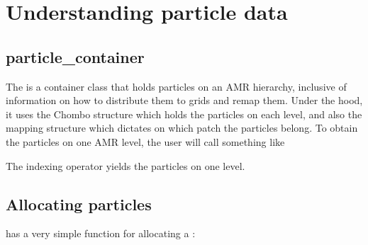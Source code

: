 \documentclass[letterpaper,10pt,english]{sphinxmanual}
\begin{document}
\section{Understanding particle data}
\label{\detokenize{ParticleData:understanding-particle-data}}\label{\detokenize{ParticleData:chap-particledata}}\label{\detokenize{ParticleData::doc}}

\subsection{particle\_container}
\label{\detokenize{ParticleData:particle-container}}
The  is a container class that holds particles on an AMR hierarchy, inclusive of information on how to distribute them to grids and remap them.
Under the hood, it uses the Chombo structure  which holds the particles on each level, and also the mapping structure  which dictates on which patch the particles belong.
To obtain the particles on one AMR level, the user will call something like

\begin{sphinxVerbatim}[commandchars=\\\{\},formatcom=\scriptsize]
 

   \PYG{p}{[}\PYG{p}{]}
\end{sphinxVerbatim}

The indexing operator \sphinxcode{\sphinxupquote{{[}int{]}}} yields the particles on one level.


\subsection{Allocating particles}
\label{\detokenize{ParticleData:allocating-particles}}
 has a very simple function for allocating a :

\begin{sphinxVerbatim}[commandchars=\\\{\},formatcom=\scriptsize]
        
\end{sphinxVerbatim}
\end{document}
